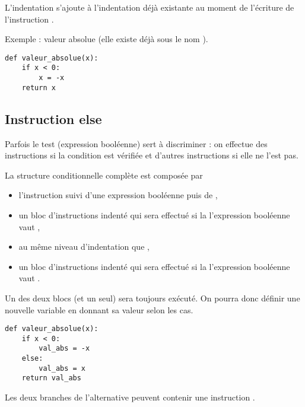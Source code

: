 L'indentation s'ajoute à l'indentation déjà existante au moment de l'écriture de l'instruction .

Exemple : valeur absolue (elle existe déjà sous le nom ).
\begin{lstlisting}
def valeur_absolue(x):
    if x < 0:
        x = -x
    return x
\end{lstlisting}
\newpage
\subsection{Instruction else}
Parfois le test (expression booléenne) sert à discriminer : on effectue des instructions si la condition est vérifiée et d'autres instructions si elle ne l'est pas.
\begin{defin}
La structure conditionnelle complète est composée par 
\begin{itemize}
 \item l'instruction  suivi d'une expression booléenne puis de \type{:},
 \item un bloc d'instructions indenté qui sera effectué si la l'expression booléenne vaut ,
 \item {} au même niveau d'indentation que ,
  \item un bloc d'instructions indenté qui sera effectué si la l'expression booléenne vaut .
\end{itemize}
\end{defin}
Un des deux blocs (et un seul) sera toujours exécuté. On pourra donc définir une nouvelle variable en donnant sa valeur selon les cas.
\begin{lstlisting}
def valeur_absolue(x):
    if x < 0:
        val_abs = -x
    else:
        val_abs = x
    return val_abs
\end{lstlisting}
Les deux branches de l'alternative peuvent contenir une instruction .
